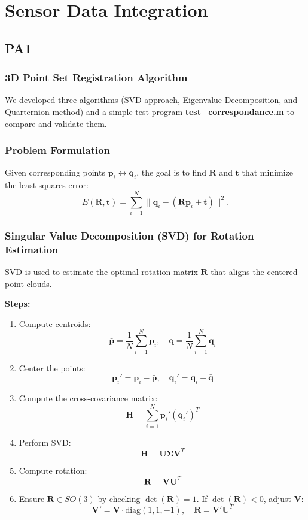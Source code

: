 \documentclass[english,10pt,a4paper]{book}
\begin{document}
    
    \chapter{Sensor Data Integration}
    \section{PA1}
    \subsection{3D Point Set Registration Algorithm}
    We developed three algorithms (SVD approach, Eigenvalue Decomposition, and Quarternion method) and a simple test program \textbf{test\_correspondance.m} to compare and validate them.
    \subsection*{Problem Formulation}
    Given corresponding points $\mathbf{p}_i \leftrightarrow \mathbf{q}_i$, the goal is to find $\mathbf{R}$ and $\mathbf{t}$ that minimize the least-squares error:
    \begin{equation}
    	E(\mathbf{R}, \mathbf{t}) = \sum_{i=1}^N \|\mathbf{q}_i - (\mathbf{R} \mathbf{p}_i + \mathbf{t})\|^2.
    \end{equation}
    
    \subsection*{Singular Value Decomposition (SVD) for Rotation Estimation}
    
    SVD is used to estimate the optimal rotation matrix $\mathbf{R}$ that aligns the centered point clouds.
    
    \textbf{Steps:}
    \begin{enumerate}
    	\item Compute centroids:
    	\[
    	\bar{\mathbf{p}} = \frac{1}{N} \sum_{i=1}^N \mathbf{p}_i, \quad \bar{\mathbf{q}} = \frac{1}{N} \sum_{i=1}^N \mathbf{q}_i
    	\]
    	\item Center the points:
    	\[
    	\mathbf{p}_i' = \mathbf{p}_i - \bar{\mathbf{p}}, \quad \mathbf{q}_i' = \mathbf{q}_i - \bar{\mathbf{q}}
    	\]
    	\item Compute the cross-covariance matrix:
    	\[
    	\mathbf{H} = \sum_{i=1}^N \mathbf{p}_i' (\mathbf{q}_i')^T
    	\]
    	\item Perform SVD:
    	\[
    	\mathbf{H} = \mathbf{U} \mathbf{\Sigma} \mathbf{V}^T
    	\]
    	\item Compute rotation:
    	\[
    	\mathbf{R} = \mathbf{V} \mathbf{U}^T
    	\]
    	\item Ensure $\mathbf{R} \in SO(3)$ by checking $\det(\mathbf{R}) = 1$. If $\det(\mathbf{R}) < 0$, adjust $\mathbf{V}$:
    	\[
    	\mathbf{V}' = \mathbf{V} \cdot \text{diag}(1, 1, -1), \quad \mathbf{R} = \mathbf{V}' \mathbf{U}^T
    	\]
    \end{enumerate}
    
\end{document}
